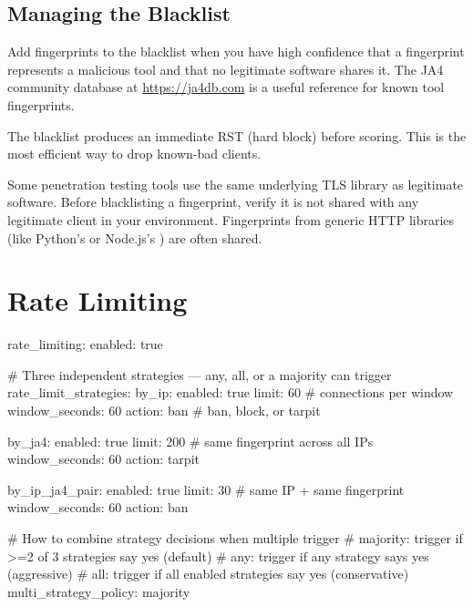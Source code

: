 \subsection{Managing the Blacklist}

Add fingerprints to the blacklist when you have high confidence that a fingerprint
represents a malicious tool and that no legitimate software shares it. The JA4
community database at \url{https://ja4db.com} is a useful reference for known
tool fingerprints.

The blacklist produces an immediate RST (hard block) before scoring. This is the
most efficient way to drop known-bad clients.

\begin{warningbox}
Some penetration testing tools use the same underlying TLS library as legitimate
software. Before blacklisting a fingerprint, verify it is not shared with any
legitimate client in your environment. Fingerprints from generic HTTP libraries
(like Python's  or Node.js's ) are often shared.
\end{warningbox}

\section{Rate Limiting}

\begin{yamlcode}
rate_limiting:
  enabled: true

  # Three independent strategies — any, all, or a majority can trigger
  rate_limit_strategies:
    by_ip:
      enabled: true
      limit: 60          # connections per window
      window_seconds: 60
      action: ban        # ban, block, or tarpit

    by_ja4:
      enabled: true
      limit: 200         # same fingerprint across all IPs
      window_seconds: 60
      action: tarpit

    by_ip_ja4_pair:
      enabled: true
      limit: 30          # same IP + same fingerprint
      window_seconds: 60
      action: ban

  # How to combine strategy decisions when multiple trigger
  # majority: trigger if >=2 of 3 strategies say yes (default)
  # any: trigger if any strategy says yes (aggressive)
  # all: trigger if all enabled strategies say yes (conservative)
  multi_strategy_policy: majority
\end{yamlcode}

